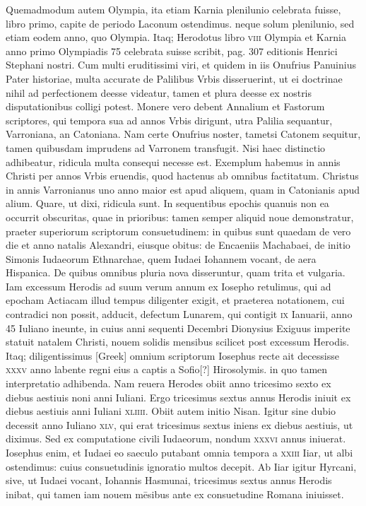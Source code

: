 \begin{parnumbers}
{}
Quemadmodum autem Olympia, ita etiam Karnia plenilunio
celebrata fuisse, libro primo, capite de periodo Laconum
ostendimus. neque solum plenilunio, sed etiam eodem anno, quo
Olympia.
\lnr{}Itaq; Herodotus libro \textsc{viii} Olympia et Karnia anno primo
Olympiadis 75 celebrata suisse scribit, pag. 307 editionis Henrici
Stephani nostri.
\lnr{}Cum multi eruditissimi viri, et quidem in iis
Onufrius Panuinius Pater historiae, multa accurate de Palilibus Vrbis
disseruerint, ut ei doctrinae nihil ad perfectionem deesse videatur,
tamen et plura deesse ex nostris disputationibus colligi potest.
\lnr{}Monere vero debent Annalium et Fastorum scriptores, qui tempora
sua ad annos Vrbis dirigunt, utra Palilia sequantur, Varroniana,
an Catoniana.
\lnr{}Nam certe Onufrius noster, tametsi Catonem sequitur,
tamen quibusdam imprudens ad Varronem transfugit.
\lnr{}Nisi
haec distinctio adhibeatur, ridicula multa consequi necesse est.
\lnr{}Exemplum habemus in annis Christi per annos Vrbis eruendis,
quod hactenus ab omnibus factitatum.
\lnr{}Christus in annis Varronianus
uno anno maior est apud aliquem, quam in Catonianis apud alium.
\lnr{}Quare, ut dixi, ridicula sunt.
\lnr{}In sequentibus epochis quanuis
non ea occurrit obscuritas, quae in prioribus: tamen semper aliquid
noue demonstratur, praeter superiorum scriptorum consuetudinem:
in quibus sunt quaedam de vero die et anno natalis Alexandri, eiusque
obitus: de Encaeniis Machabaei, de initio Simonis Iudaeorum
Ethnarchae, quem Iudaei Iohannem vocant, de aera Hispanica.
\lnr{}De quibus omnibus pluria nova disseruntur, quam trita et vulgaria.
\lnr{}Iam
excessum Herodis ad suum verum annum ex Iosepho retulimus,
qui ad epocham Actiacam illud tempus diligenter exigit, et praeterea
notationem, cui contradici non possit, adducit, defectum Lunarem,
qui contigit \textsc{ix} Ianuarii, anno 45 Iuliano ineunte, in cuius
anni sequenti Decembri Dionysius Exiguus imperite statuit natalem
Christi, nouem solidis mensibus scilicet post excessum Herodis.
\lnr{}Itaq; diligentissimus \textgreek{[Greek]} omnium scriptorum Iosephus
recte ait decessisse \textsc{xxxv} anno labente regni eius a captis a Sofio[?]
Hirosolymis. in quo tamen interpretatio adhibenda.
\lnr{}Nam reuera Herodes
obiit anno tricesimo sexto ex diebus aestiuis noni anni Iuliani.
\lnr{}Ergo tricesimus sextus annus Herodis iniuit ex diebus aestiuis anni
Iuliani \textsc{xliiii}.
\lnr{}Obiit autem initio Nisan.
\lnr{}Igitur sine dubio decessit
anno Iuliano \textsc{xlv}, qui erat tricesimus sextus iniens ex diebus aestiuis,
ut diximus.
\lnr{}Sed ex computatione civili Iudaeorum, nondum
\textsc{xxxvi} annus iniuerat.
\lnr{}Iosephus enim, et Iudaei eo saeculo putabant
omnia tempora a \textsc{xxiii} Iiar, ut albi ostendimus: cuius consuetudinis
ignoratio multos decepit.
\lnr{}Ab Iiar igitur Hyrcani, sive, ut Iudaei
vocant, Iohannis Hasmunai, tricesimus sextus annus Herodis inibat,
qui tamen iam nouem mēsibus ante ex consuetudine Romana iniuisset.


\end{parnumbers}
